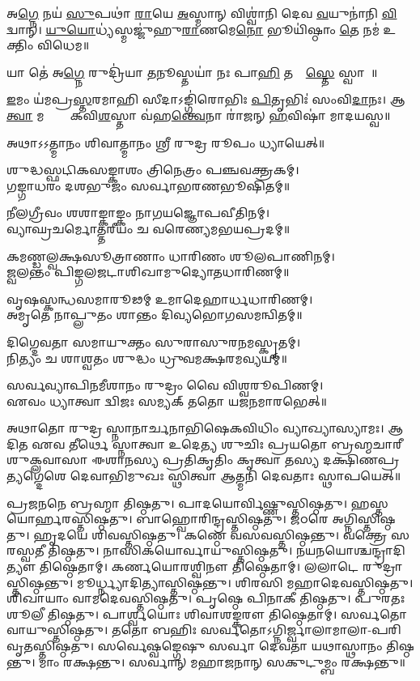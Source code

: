 𑌅\ul{𑌗𑍍𑌨𑍇} 𑌨𑌯॑ \ul{𑌸𑍁}𑌪𑌥𑌾॑ \ul{𑌰𑌾}𑌯𑍇 \ul{𑌅}𑌸𑍍𑌮𑌾𑌨𑍍 𑌵𑌿𑌶𑍍𑌵𑌾॑𑌨𑌿 𑌦𑍇𑌵 \ul{𑌵}𑌯𑍁𑌨𑌾॑𑌨𑌿 \ul{𑌵𑌿}𑌦𑍍𑌵𑌾𑌨𑍍। 
\ul{𑌯𑍁}\ul{𑌯𑍋}𑌧𑍍𑌯॑𑌸𑍍𑌮𑌜𑍍𑌜𑍁॑𑌹𑍁\ul{𑌰𑌾}𑌣𑌮𑍇\ul{𑌨𑍋} 𑌭𑍂𑌯𑌿॑𑌷𑍍𑌠𑌾𑌂 \ul{𑌤𑍇} 𑌨𑌮॑ 𑌉𑌕𑍍𑌤𑌿𑌂 𑌵𑌿𑌧𑍇𑌮॥\\

𑌯𑌾 𑌤𑍇॑ 𑌅\ul{𑌗𑍍𑌨𑍇} 𑌰𑍁𑌦𑍍𑌰𑌿॑𑌯𑌾 \ul{𑌤}𑌨𑍂𑌸𑍍𑌤𑌯𑌾॑ 𑌨𑌃 𑌪𑌾\ul{𑌹𑌿} 𑌤𑌸𑍍𑌯𑌾᳚\ul{𑌸𑍍𑌤𑍇} 𑌸𑍍𑌵𑌾𑌹𑌾᳚॥

\ul{𑌇}𑌮𑌂 𑌯॑𑌮𑌪𑍍𑌰\ul{𑌸𑍍𑌤}𑌰𑌮𑌾𑌹𑌿 𑌸𑍀𑌦𑌾𑌽𑌙𑍍𑌗𑌿॑𑌰𑍋𑌭𑌿𑌃 \ul{𑌪𑌿}𑌤𑍃𑌭𑌿𑌃॑ 𑌸𑌂𑌵𑌿\ul{𑌦𑌾}𑌨𑌃। 𑌆\ul{𑌤𑍍𑌵𑌾} 𑌮𑌨𑍍𑌤𑍍𑌰𑌾𑌃᳚ 𑌕𑌵𑌿\ul{𑌶}𑌸𑍍𑌤𑌾 𑌵॑𑌹\ul{𑌨𑍍𑌤𑍍𑌵𑍇}𑌨𑌾 𑌰𑌾॑𑌜𑌨𑍍 \ul{𑌹}𑌵𑌿𑌷𑌾॑ 𑌮𑌾𑌦𑌯𑌸𑍍𑌵॥\\
{\small \closesection}

𑌅𑌥𑌾𑌽𑌽𑌤𑍍𑌮𑌾𑌨𑌂 𑌶𑌿𑌵𑌾𑌤𑍍𑌮𑌾𑌨𑌂 𑌶𑍍𑌰𑍀 𑌰𑍁𑌦𑍍𑌰 𑌰𑍂𑌪𑌂 𑌧𑍍𑌯𑌾𑌯𑍇𑌤𑍍॥

𑌶𑍁𑌦𑍍𑌧𑌸𑍍𑌫𑌟𑌿𑌕𑌸𑌙𑍍𑌕𑌾𑌶𑌂 𑌤𑍍𑌰𑌿𑌨𑍇𑌤𑍍𑌰𑌂 𑌪𑌞𑍍𑌚𑌵𑌕𑍍𑌤𑍍𑌰𑌕𑌮𑍍।\\
𑌗𑌙𑍍𑌗𑌾𑌧𑌰𑌂 𑌦𑌶𑌭𑍁𑌜𑌂 𑌸𑌰𑍍𑌵𑌾𑌭𑌰𑌣𑌭𑍂𑌷𑌿𑌤𑌮𑍍॥

𑌨𑍀𑌲𑌗𑍍𑌰𑍀𑌵𑌂 𑌶𑌶𑌾𑌙𑍍𑌕𑌾𑌙𑍍𑌕𑌂 𑌨𑌾𑌗𑌯𑌜𑍍𑌞𑍋𑌪𑌵𑍀𑌤𑌿𑌨𑌮𑍍।\\
𑌵𑍍𑌯𑌾𑌘𑍍𑌰𑌚𑌰𑍍𑌮𑍋𑌤𑍍𑌤𑌰𑍀𑌯𑌂 𑌚 𑌵𑌰𑍇𑌣𑍍𑌯𑌮𑌭𑌯𑌪𑍍𑌰𑌦𑌮𑍍॥

𑌕𑌮𑌣𑍍𑌡𑌲𑍍𑌵𑌕𑍍𑌷𑌸𑍂𑌤𑍍𑌰𑌾𑌣𑌾𑌂 𑌧𑌾𑌰𑌿𑌣𑌂 𑌶𑍂𑌲𑌪𑌾𑌣𑌿𑌨𑌮𑍍।\\
𑌜𑍍𑌵𑌲𑌨𑍍𑌤𑌂 𑌪𑌿𑌙𑍍𑌗𑌲𑌜𑌟𑌾𑌶𑌿𑌖𑌾𑌮𑍁𑌦𑍍𑌯𑍋𑌤𑌧𑌾𑌰𑌿𑌣𑌮𑍍॥

𑌵𑍃𑌷𑌸𑍍𑌕𑌨𑍍𑌧𑌸𑌮𑌾𑌰𑍂𑌢𑌮𑍍 𑌉𑌮𑌾𑌦𑍇𑌹𑌾𑌰𑍍𑌧𑌧𑌾𑌰𑌿𑌣𑌮𑍍।\\
𑌅𑌮𑍃𑌤𑍇  𑌨𑌾𑌪𑍍𑌲𑍁𑌤𑌂 𑌶𑌾𑌨𑍍𑌤𑌂 𑌦𑌿𑌵𑍍𑌯𑌭𑍋𑌗𑌸𑌮𑌨𑍍𑌵𑌿𑌤𑌮𑍍॥

𑌦𑌿𑌗𑍍𑌦𑍇𑌵𑌤𑌾 𑌸𑌮𑌾𑌯𑍁𑌕𑍍𑌤𑌂 𑌸𑍁𑌰𑌾𑌸𑍁𑌰𑌨𑌮𑌸𑍍𑌕𑍃𑌤𑌮𑍍।\\
𑌨𑌿𑌤𑍍𑌯𑌂 𑌚 𑌶𑌾𑌶𑍍𑌵𑌤𑌂 𑌶𑍁𑌦𑍍𑌧𑌂 𑌧𑍍𑌰𑍁𑌵𑌮𑌕𑍍𑌷𑌰𑌮𑌵𑍍𑌯𑌯𑌮𑍍॥

𑌸𑌰𑍍𑌵𑌵𑍍𑌯𑌾𑌪𑌿𑌨𑌮𑍀𑌶𑌾𑌨𑌂 𑌰𑍁𑌦𑍍𑌰𑌂 𑌵𑍈 𑌵𑌿𑌶𑍍𑌵𑌰𑍂𑌪𑌿𑌣𑌮𑍍।\\
𑌏𑌵𑌂 𑌧𑍍𑌯𑌾𑌤𑍍𑌵𑌾 𑌦𑍍𑌵𑌿𑌜𑌃 𑌸𑌮𑍍𑌯𑌕𑍍 𑌤𑌤𑍋 𑌯𑌜𑌨𑌮𑌾𑌰𑌭𑍇𑌤𑍍॥

𑌅𑌥𑌾𑌤𑍋 𑌰𑍁𑌦𑍍𑌰 𑌸𑍍𑌨𑌾𑌨𑌾𑌰𑍍𑌚𑌨𑌾𑌭𑌿𑌷𑍇𑌕𑌵𑌿𑌧𑌿𑌂 𑌵𑍍𑌯𑌾𑌖𑍍𑌯𑌾𑌸𑍍𑌯𑌾𑌮𑌃। 𑌆𑌦𑌿𑌤 𑌏𑌵 𑌤𑍀𑌰𑍍𑌥𑍇 𑌸𑍍𑌨𑌾𑌤𑍍𑌵𑌾 𑌉𑌦𑍇𑌤𑍍𑌯 𑌶𑍁𑌚𑌿𑌃
𑌪𑍍𑌰𑌯𑌤𑍋 𑌬𑍍𑌰𑌹𑍍𑌮𑌚𑌾𑌰𑍀 𑌶𑍁𑌕𑍍𑌲𑌵𑌾𑌸𑌾 𑌈𑌶𑌾𑌨𑌸𑍍𑌯 𑌪𑍍𑌰𑌤𑌿𑌕𑍃𑌤𑌿𑌂 𑌕𑍃𑌤𑍍𑌵𑌾 𑌤𑌸𑍍𑌯 𑌦𑌕𑍍𑌷𑌿𑌣𑌪𑍍𑌰𑌤𑍍𑌯𑌗𑍍𑌦𑍇𑌶𑍇 𑌦𑍇𑌵𑌾𑌭𑌿𑌮𑍁𑌖𑌃 𑌸𑍍𑌥𑌿𑌤𑍍𑌵𑌾 𑌆𑌤𑍍𑌮𑌨𑌿 𑌦𑍇𑌵𑌤𑌾𑌃 𑌸𑍍𑌥𑌾𑌪𑌯𑍇𑌤𑍍॥

𑌪𑍍𑌰𑌜𑌨𑌨𑍇 𑌬𑍍𑌰𑌹𑍍𑌮𑌾 𑌤𑌿𑌷𑍍𑌠𑌤𑍁। 𑌪𑌾𑌦𑌯𑍋𑌰𑍍𑌵𑌿𑌷𑍍𑌣𑍁𑌸𑍍𑌤𑌿𑌷𑍍𑌠𑌤𑍁। 
𑌹𑌸𑍍𑌤𑌯𑍋𑌰𑍍𑌹𑌰𑌸𑍍𑌤𑌿𑌷𑍍𑌠𑌤𑍁। 𑌬𑌾𑌹𑍍𑌵𑍋𑌰𑌿𑌨𑍍𑌦𑍍𑌰𑌸𑍍𑌤𑌿𑌷𑍍𑌠𑌤𑍁। 
𑌜𑌠𑌰𑍇 𑌅𑌗𑍍𑌨𑌿𑌸𑍍𑌤𑌿𑌷𑍍𑌠𑌤𑍁। 𑌹𑍃𑌦𑌯𑍇 𑌶𑌿𑌵𑌸𑍍𑌤𑌿𑌷𑍍𑌠𑌤𑍁। 
𑌕𑌣𑍍𑌠𑍇 𑌵𑌸𑌵𑌸𑍍𑌤𑌿𑌷𑍍𑌠𑌨𑍍𑌤𑍁। 𑌵𑌕𑍍𑌤𑍍𑌰𑍇 𑌸𑌰𑌸𑍍𑌵𑌤𑍀 𑌤𑌿𑌷𑍍𑌠𑌤𑍁। 
𑌨𑌾𑌸𑌿𑌕𑌯𑍋𑌰𑍍\-𑌵𑌾𑌯𑍁𑌸𑍍𑌤𑌿𑌷𑍍𑌠𑌤𑍁। 𑌨𑌯𑌨𑌯𑍋𑌶𑍍𑌚𑌨𑍍𑌦𑍍𑌰𑌾𑌦𑌿𑌤𑍍𑌯𑍗 𑌤𑌿𑌷𑍍𑌠𑍇𑌤𑌾𑌮𑍍। 
𑌕𑌰𑍍𑌣𑌯𑍋𑌰𑌶𑍍𑌵𑌿𑌨𑍗 𑌤𑌿𑌷𑍍𑌠𑍇𑌤𑌾𑌮𑍍। 𑌲𑌲𑌾𑌟𑍇 𑌰𑍁𑌦𑍍𑌰𑌾𑌸𑍍𑌤𑌿𑌷𑍍𑌠𑌨𑍍𑌤𑍁। 
𑌮𑍂𑌰𑍍𑌧𑍍𑌨𑍍𑌯𑌾𑌦𑌿𑌤𑍍𑌯𑌾𑌸𑍍𑌤𑌿𑌷𑍍𑌠𑌨𑍍𑌤𑍁। 𑌶𑌿𑌰𑌸𑌿 𑌮𑌹𑌾𑌦𑍇𑌵𑌸𑍍𑌤𑌿𑌷𑍍𑌠𑌤𑍁। 
𑌶𑌿𑌖𑌾𑌯𑌾𑌂 𑌵𑌾𑌮𑌦𑍇𑌵𑌸𑍍𑌤𑌿𑌷𑍍𑌠𑌤𑍁। 𑌪𑍃𑌷𑍍𑌠𑍇 𑌪𑌿𑌨𑌾𑌕𑍀 𑌤𑌿𑌷𑍍𑌠𑌤𑍁। 
𑌪𑍁𑌰𑌤𑌃 𑌶𑍂𑌲𑍀 𑌤𑌿𑌷𑍍𑌠𑌤𑍁। 𑌪𑌾𑌰𑍍𑌶𑍍𑌵𑌯𑍋𑌃 𑌶𑌿𑌵𑌾𑌶𑌙𑍍𑌕𑌰𑍗 𑌤𑌿𑌷𑍍𑌠𑍇𑌤𑌾𑌮𑍍। 
𑌸𑌰𑍍𑌵𑌤𑍋 𑌵𑌾𑌯𑍁𑌸𑍍𑌤𑌿𑌷𑍍𑌠𑌤𑍁। 𑌤𑌤𑍋 𑌬𑌹𑌿𑌃 𑌸𑌰𑍍𑌵𑌤𑍋𑌽𑌗𑍍𑌨𑌿𑌰𑍍𑌜𑍍𑌵𑌾𑌲𑌾𑌮𑌾𑌲𑌾-𑌪𑌰𑌿𑌵𑍃𑌤𑌸𑍍𑌤𑌿𑌷𑍍𑌠𑌤𑍁।
𑌸𑌰𑍍𑌵𑍇𑌷𑍍𑌵𑌙𑍍𑌗𑍇𑌷𑍁 𑌸𑌰𑍍𑌵𑌾 𑌦𑍇𑌵𑌤𑌾 𑌯𑌥𑌾𑌸𑍍𑌥𑌾𑌨𑌂 𑌤𑌿𑌷𑍍𑌠𑌨𑍍𑌤𑍁। 𑌮𑌾𑌂 𑌰𑌕𑍍𑌷𑌨𑍍𑌤𑍁।
\lbrack 𑌸𑌰𑍍𑌵𑌾𑌨𑍍 𑌮𑌹𑌾𑌜𑌨𑌾𑌨𑍍 𑌸𑌕𑍁𑌟𑍁𑌮𑍍𑌬𑌂 𑌰𑌕𑍍𑌷𑌨𑍍𑌤𑍁॥\rbrack

